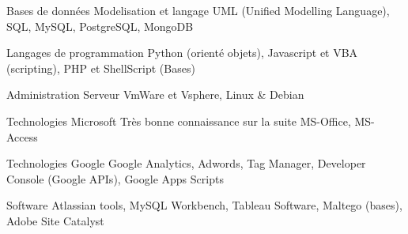 

\begin{cvskills}

  \cvskill
    {Bases de données} %
    {Modelisation et langage UML (Unified Modelling Language), SQL, MySQL, PostgreSQL, MongoDB} %
    
  \cvskill
	{Langages de programmation} %
	{Python (orienté objets), Javascript et VBA (scripting), PHP et ShellScript (Bases)} %

  \cvskill
	{Administration Serveur} %
	{VmWare et Vsphere, Linux \& Debian} %
	
  \cvskill
	{Technologies Microsoft} %
	{Très bonne connaissance sur la suite MS-Office, MS-Access} %

  \cvskill
	{Technologies Google} %
	{Google Analytics, Adwords, Tag Manager, Developer Console (Google APIs), Google Apps Scripts} %


  \cvskill
    {Software} %
    {Atlassian tools, MySQL Workbench, Tableau Software, Maltego (bases), Adobe Site Catalyst} %


\end{cvskills}
